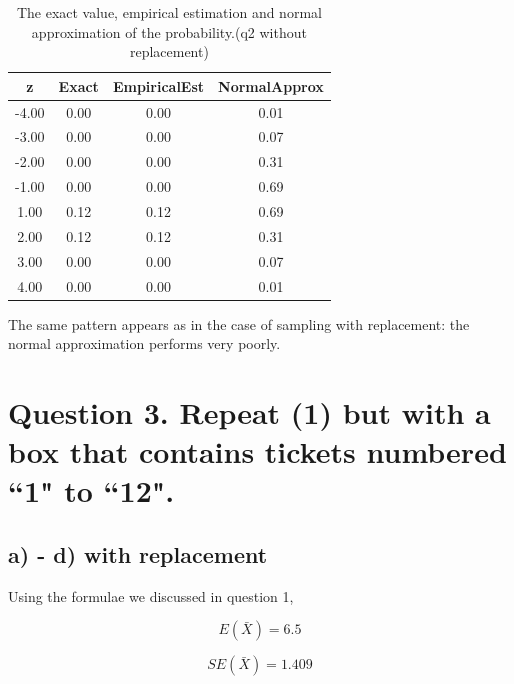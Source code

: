 \documentclass[11pt]{article}
\begin{document}
\begin{table}[H]
\centering
\begin{tabular}{|c|ccc|}
  \hline
z & Exact & EmpiricalEst & NormalApprox \\ 
  \hline
-4.00 & 0.00 & 0.00 & 0.01 \\ 
  -3.00 & 0.00 & 0.00 & 0.07 \\ 
  -2.00 & 0.00 & 0.00 & 0.31 \\ 
  -1.00 & 0.00 & 0.00 & 0.69 \\ 
  1.00 & 0.12 & 0.12 & 0.69 \\ 
  2.00 & 0.12 & 0.12 & 0.31 \\ 
  3.00 & 0.00 & 0.00 & 0.07 \\ 
  4.00 & 0.00 & 0.00 & 0.01 \\ 
   \hline
\end{tabular}
\caption{The exact value, empirical estimation and normal approximation of the probability.(q2 without replacement)} 
\end{table}


The same pattern appears as in the case of sampling with replacement: the normal approximation performs very poorly.


\newpage

 \section*{Question 3. Repeat (1) but with a box that contains tickets numbered ``1" to ``12".}
 
 \subsection*{a) - d) with replacement}
Using the formulae we discussed in question 1,

$$E(\bar{X})= 6.5$$ 
 
 $$SE(\bar{X}) = 1.409$$
\end{document}

